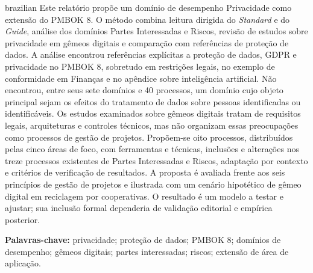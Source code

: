 \documentclass[12pt,a4paper,article,oneside,brazil,english]{abntex2}
\begin{document}
\begin{resumo}[Resumo]
\begin{otherlanguage*}{brazilian}
Este relatório propõe um domínio de desempenho Privacidade como extensão do PMBOK 8. O método combina leitura dirigida do \textit{Standard} e do \textit{Guide}, análise dos domínios Partes Interessadas e Riscos, revisão de estudos sobre privacidade em gêmeos digitais e comparação com referências de proteção de dados. A análise encontrou referências explícitas a proteção de dados, GDPR e privacidade no PMBOK 8, sobretudo em restrições legais, no exemplo de conformidade em Finanças e no apêndice sobre inteligência artificial. Não encontrou, entre seus sete domínios e 40 processos, um domínio cujo objeto principal sejam os efeitos do tratamento de dados sobre pessoas identificadas ou identificáveis. Os estudos examinados sobre gêmeos digitais tratam de requisitos legais, arquiteturas e controles técnicos, mas não organizam essas preocupações como processos de gestão de projetos. Propõem-se oito processos, distribuídos pelas cinco áreas de foco, com ferramentas e técnicas, inclusões e alterações nos treze processos existentes de Partes Interessadas e Riscos, adaptação por contexto e critérios de verificação de resultados. A proposta é avaliada frente aos seis princípios de gestão de projetos e ilustrada com um cenário hipotético de gêmeo digital em reciclagem por cooperativas. O resultado é um modelo a testar e ajustar; sua inclusão formal dependeria de validação editorial e empírica posterior.

\vspace{\onelineskip}
\noindent\textbf{Palavras-chave:} privacidade; proteção de dados; PMBOK 8; domínios de desempenho; gêmeos digitais; partes interessadas; riscos; extensão de área de aplicação.
\end{otherlanguage*}
\end{resumo}

\clearpage

\tableofcontents
\clearpage
\listoffigures
\clearpage
\listoftables
\clearpage
\end{document}
